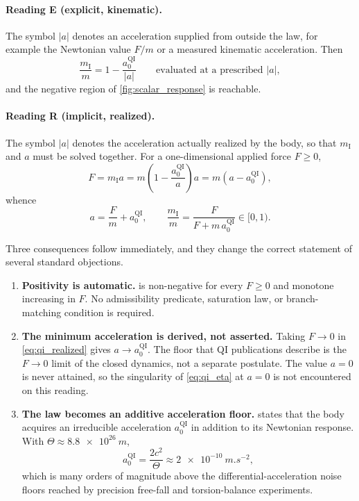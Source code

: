 \documentclass[11pt]{article}
\newcommand{\QI}{\mathrm{QI}}
\begin{document}
\paragraph{Reading E (explicit, kinematic).} The symbol \(|a|\) denotes an acceleration supplied from outside the law, for example the Newtonian value \(F/m\) or a measured kinematic acceleration. Then
\begin{equation}
    \frac{m_{\mathrm I}}{m}
    =1-\frac{a_{0}^{\QI}}{|a|}
    \qquad\text{evaluated at a prescribed }|a|,
    \label{eq:reading_E}
\end{equation}
and the negative region of \cref{fig:scalar_response} is reachable.

\paragraph{Reading R (implicit, realized).} The symbol \(|a|\) denotes the acceleration actually realized by the body, so that \(m_{\mathrm I}\) and \(a\) must be solved together. For a one-dimensional applied force \(F\ge0\),
\begin{equation}
    F=m_{\mathrm I}a
    =m\left(1-\frac{a_{0}^{\QI}}{a}\right)a
    =m\left(a-a_{0}^{\QI}\right),
    \label{eq:qi_implicit}
\end{equation}
whence
\begin{equation}
    \boxed{\;
    a=\frac{F}{m}+a_{0}^{\QI},
    \qquad
    \frac{m_{\mathrm I}}{m}
    =\frac{F}{F+m\,a_{0}^{\QI}}
    \in[0,1).
    \;}
    \label{eq:qi_realized}
\end{equation}

Three consequences follow immediately, and they change the correct statement of several standard objections.

\begin{enumerate}[leftmargin=1.55em]
    \item \textbf{Positivity is automatic.}  is non-negative for every \(F\ge0\) and monotone increasing in \(F\). No admissibility predicate, saturation law, or branch-matching condition is required.
    \item \textbf{The minimum acceleration is derived, not asserted.} Taking \(F\to0\) in \cref{eq:qi_realized} gives \(a\to a_{0}^{\QI}\). The floor that QI publications describe is the \(F\to0\) limit of the closed dynamics, not a separate postulate. The value \(a=0\) is never attained, so the singularity of \cref{eq:qi_eta} at \(a=0\) is not encountered on this reading.
    \item \textbf{The law becomes an additive acceleration floor.}  states that the body acquires an irreducible acceleration \(a_{0}^{\QI}\) in addition to its Newtonian response. With \(\Theta\approx\SI{8.8e26}{m}\),
    \begin{equation}
        a_{0}^{\QI}=\frac{2c^{2}}{\Theta}\approx\SI{2e-10}{m.s^{-2}},
        \label{eq:a0_numeric}
    \end{equation}
    which is many orders of magnitude above the differential-acceleration noise floors reached by precision free-fall and torsion-balance experiments.
\end{enumerate}
\end{document}
